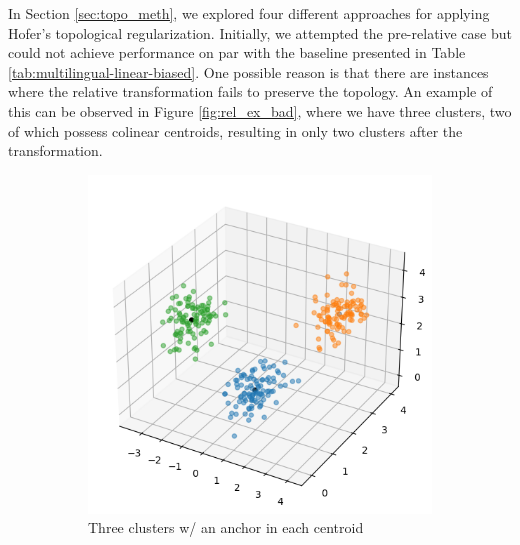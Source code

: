 \documentclass[../main.tex]{subfiles}
\begin{document}
In Section \ref{sec:topo_meth}, we explored four different approaches for applying Hofer's topological regularization. Initially, we attempted the pre-relative case but could not achieve performance on par with the baseline presented in Table \ref{tab:multilingual-linear-biased}. One possible reason is that there are instances where the relative transformation fails to preserve the topology. An example of this can be observed in Figure \ref{fig:rel_ex_bad}, where we have three clusters, two of which possess colinear centroids, resulting in only two clusters after the transformation.\\


\begin{figure}[ht!]
     \centering
    \begin{subfigure}[b]{0.45\textwidth}
         \centering
         \includegraphics[width=\textwidth]{figures/rs/stitching/clusters_1.png}
        \caption{Three clusters w/ an anchor in each centroid}
         \label{fig:rel_ex_1}
     \end{subfigure}\hfill
      \begin{subfigure}[b]{0.45\textwidth}
         \centering

\end{subfigure}
\end{figure}
\end{document}
